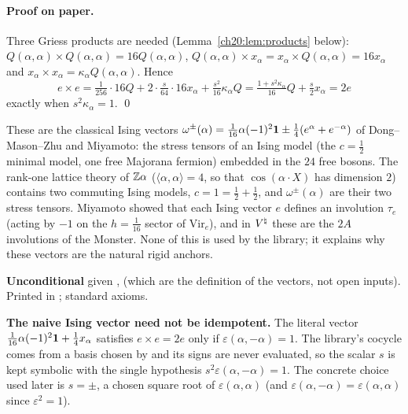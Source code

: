 \paragraph{Proof on paper.}  Three Griess products are needed (Lemma~\ref{ch20:lem:products} below):
$Q(\alpha,\alpha)\times Q(\alpha,\alpha)=16Q(\alpha,\alpha)$, $Q(\alpha,\alpha)\times x_\alpha=x_\alpha\times Q(\alpha,\alpha)=16x_\alpha$ and
$x_\alpha\times x_\alpha=\kappa_\alpha Q(\alpha,\alpha)$.  Hence
\begin{equation*}
  e\times e=\tfrac1{256}\cdot16Q+2\cdot\tfrac{s}{64}\cdot16x_\alpha+\tfrac{s^2}{16}\kappa_\alpha Q
  =\tfrac{1+s^2\kappa_\alpha}{16}Q+\tfrac s2x_\alpha=2e
\end{equation*}
exactly when $s^2\kappa_\alpha=1$. \qed
\begin{physics}
These are the classical Ising vectors $\omega^\pm(\alpha)=\tfrac1{16}\alpha(-1)^2\mathbf 1\pm\tfrac14(e^\alpha+e^{-\alpha})$ of
Dong--Mason--Zhu and Miyamoto: the stress tensors of an Ising model (the $c=\tfrac12$ minimal model, one free Majorana
fermion) embedded in the $24$ free bosons.  The rank-one lattice theory of ${\mathbb{Z}}\alpha$ ($\langle\alpha,\alpha\rangle=4$, so that
$\cos(\alpha\cdot X)$ has dimension $2$) contains two commuting Ising models, $c=1=\tfrac12+\tfrac12$, and $\omega^\pm(\alpha)$ are
their two stress tensors.  Miyamoto showed that each Ising vector $e$ defines an involution $\tau_e$ (acting by $-1$ on the
$h=\tfrac1{16}$ sector of $\mathrm{Vir}_e$), and in ${V^{\natural}}$ these are the $2A$ involutions of the Monster.  None of this
is used by the library; it explains why these vectors are the natural rigid anchors.
\end{physics}
\begin{status}
\textbf{Unconditional} given ,  (which are the definition of the vectors, not open inputs).  Printed in
; standard axioms.
\end{status}

\begin{warning}
\textbf{The naive Ising vector need not be idempotent.}  The literal vector
$\tfrac1{16}\alpha(-1)^2\mathbf 1+\tfrac14x_\alpha$ satisfies $e\times e=2e$ only if $\varepsilon(\alpha,-\alpha)=1$.  The library's
cocycle comes from a basis chosen by  and its signs are never evaluated, so the scalar
$s$ is kept symbolic with the single hypothesis $s^2\varepsilon(\alpha,-\alpha)=1$.  The concrete choice used later is
$s=\pm$, a chosen square root of $\varepsilon(\alpha,\alpha)$ (and $\varepsilon(\alpha,-\alpha)=\varepsilon(\alpha,\alpha)$
since $\varepsilon^2=1$).
\end{warning}

